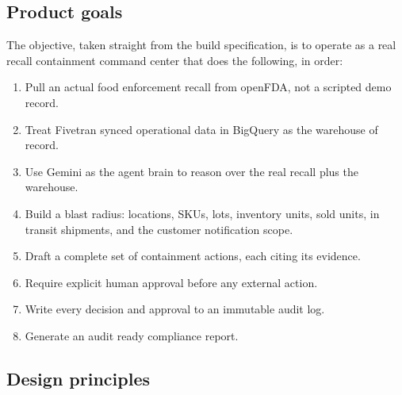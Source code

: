 \documentclass[11pt]{article}
\begin{document}
\subsection{Product goals}

The objective, taken straight from the build specification, is to operate as a real recall
containment command center that does the following, in order:

\begin{enumerate}
\item Pull an actual food enforcement recall from openFDA, not a scripted demo record.
\item Treat Fivetran synced operational data in BigQuery as the warehouse of record.
\item Use Gemini as the agent brain to reason over the real recall plus the warehouse.
\item Build a blast radius: locations, SKUs, lots, inventory units, sold units, in transit shipments, and the customer notification scope.
\item Draft a complete set of containment actions, each citing its evidence.
\item Require explicit human approval before any external action.
\item Write every decision and approval to an immutable audit log.
\item Generate an audit ready compliance report.
\end{enumerate}

\subsection{Design principles}
\end{document}
